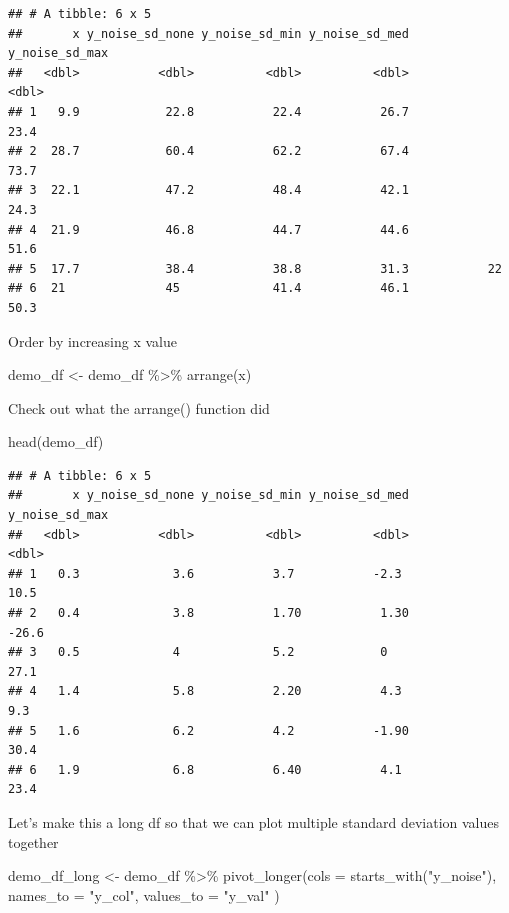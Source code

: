 \documentclass[
]{book}
\newenvironment{Shaded}{\begin{snugshade}}{\end{snugshade}}
\newcommand{\AttributeTok}[1]{\textcolor[rgb]{0.77,0.63,0.00}{#1}}
\newcommand{\FunctionTok}[1]{\textcolor[rgb]{0.00,0.00,0.00}{#1}}
\newcommand{\NormalTok}[1]{#1}
\newcommand{\OtherTok}[1]{\textcolor[rgb]{0.56,0.35,0.01}{#1}}
\newcommand{\SpecialCharTok}[1]{\textcolor[rgb]{0.00,0.00,0.00}{#1}}
\newcommand{\StringTok}[1]{\textcolor[rgb]{0.31,0.60,0.02}{#1}}
\begin{document}
\begin{verbatim}
## # A tibble: 6 x 5
##       x y_noise_sd_none y_noise_sd_min y_noise_sd_med y_noise_sd_max
##   <dbl>           <dbl>          <dbl>          <dbl>          <dbl>
## 1   9.9            22.8           22.4           26.7           23.4
## 2  28.7            60.4           62.2           67.4           73.7
## 3  22.1            47.2           48.4           42.1           24.3
## 4  21.9            46.8           44.7           44.6           51.6
## 5  17.7            38.4           38.8           31.3           22  
## 6  21              45             41.4           46.1           50.3
\end{verbatim}

Order by increasing x value

\begin{Shaded}
\begin{Highlighting}[]
\NormalTok{demo\_df }\OtherTok{\textless{}{-}}\NormalTok{ demo\_df }\SpecialCharTok{\%\textgreater{}\%} 
  \FunctionTok{arrange}\NormalTok{(x)}
\end{Highlighting}
\end{Shaded}

Check out what the arrange() function did

\begin{Shaded}
\begin{Highlighting}[]
\FunctionTok{head}\NormalTok{(demo\_df)}
\end{Highlighting}
\end{Shaded}

\begin{verbatim}
## # A tibble: 6 x 5
##       x y_noise_sd_none y_noise_sd_min y_noise_sd_med y_noise_sd_max
##   <dbl>           <dbl>          <dbl>          <dbl>          <dbl>
## 1   0.3             3.6           3.7           -2.3            10.5
## 2   0.4             3.8           1.70           1.30          -26.6
## 3   0.5             4             5.2            0              27.1
## 4   1.4             5.8           2.20           4.3             9.3
## 5   1.6             6.2           4.2           -1.90           30.4
## 6   1.9             6.8           6.40           4.1            23.4
\end{verbatim}

Let's make this a long df so that we can plot multiple standard deviation values together

\begin{Shaded}
\begin{Highlighting}[]
\NormalTok{demo\_df\_long }\OtherTok{\textless{}{-}}\NormalTok{ demo\_df }\SpecialCharTok{\%\textgreater{}\%} 
  \FunctionTok{pivot\_longer}\NormalTok{(}\AttributeTok{cols =} \FunctionTok{starts\_with}\NormalTok{(}\StringTok{"y\_noise"}\NormalTok{),}
               \AttributeTok{names\_to =} \StringTok{"y\_col"}\NormalTok{,}
               \AttributeTok{values\_to =} \StringTok{"y\_val"}
\NormalTok{  )}
\end{Highlighting}
\end{Shaded}
\end{document}
